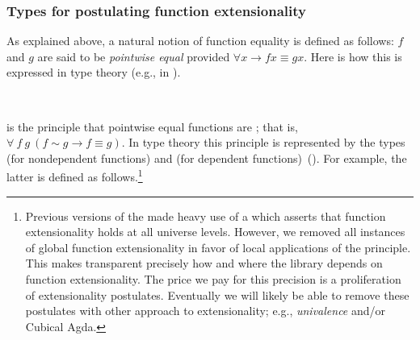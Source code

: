 \subsubsection*{Types for postulating function extensionality} %

As explained above, a natural notion of function equality is defined as follows: \(f\) and \(g\) are said to be \emph{pointwise equal} provided \(∀ x → f x ≡ g x\). Here is how this is expressed in type theory (e.g., in \typtop).
\ccpad
\begin{code}%
\>[1]\AgdaSpace{}%
\AgdaSymbol{:}\AgdaSpace{}%
\AgdaSymbol{\{}\AgdaSpace{}%
\AgdaSymbol{:}\AgdaSpace{}%
\AgdaSpace{}%
\AgdaSpace{}%
\AgdaSymbol{\}}\AgdaSpace{}%
\AgdaSymbol{\{}\AgdaSpace{}%
\AgdaSymbol{:}\AgdaSpace{}%
\AgdaSpace{}%
\AgdaSpace{}%
\AgdaSpace{}%
\AgdaSpace{}%
\AgdaSymbol{\}}\AgdaSpace{}%
\AgdaSpace{}%
\AgdaSpace{}%
\AgdaSpace{}%
\AgdaSpace{}%
\AgdaSpace{}%
\AgdaSpace{}%
\AgdaSpace{}%
\AgdaSpace{}%
\AgdaSpace{}%
\AgdaSpace{}%
\<%
\\
%
\>[1]\AgdaSpace{}%
\AgdaSpace{}%
\AgdaSpace{}%
\AgdaSymbol{=}\AgdaSpace{}%
\AgdaSpace{}%
\AgdaSpace{}%
\AgdaSpace{}%
\AgdaSpace{}%
\AgdaSpace{}%
\AgdaSpace{}%
\AgdaSpace{}%
\<%
\end{code}
\ccpad
{} is the principle that pointwise equal functions are ; that is, \(\forall\ f\ g\ (f ∼ g → f ≡ g)\). In type theory this principle is represented by the types  (for nondependent functions) and  (for dependent functions)~(\cite[\S2.9]{HoTT}).
For example, the latter is defined as follows.\footnote{%
Previous versions of the \ualib made heavy use of a  which asserts that function extensionality holds at all universe levels.
However, we removed all instances of global function extensionality in favor of local applications of the principle. This makes transparent precisely how and where the library depends on function extensionality. The price we pay for this precision is a proliferation of extensionality postulates. Eventually we will likely be able to remove these postulates with other approach to extensionality; e.g., \emph{univalence} and/or Cubical Agda.}
